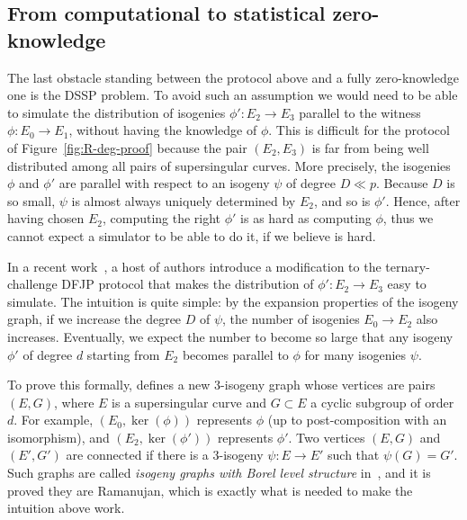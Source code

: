 \subsection{From computational to statistical zero-knowledge}
\label{sec:from-comp-stat}

The last obstacle standing between the protocol above and a fully
zero-knowledge one is the DSSP problem. To avoid such an assumption we would need
to be able to simulate the distribution of isogenies $\phi': E_2\to E_3$ parallel
to the witness $\phi: E_0\to E_1$, without having the knowledge of
$\phi$.  This is difficult for the protocol of
Figure~\ref{fig:R-deg-proof} because the pair $(E_2,E_3)$ is far from
being well distributed among all pairs of supersingular curves.
%
More precisely, the isogenies $\phi$ and $\phi'$ are parallel with
respect to an isogeny $\psi$ of degree $D \ll p$.  Because $D$ is so
small, $\psi$ is almost always uniquely determined by $E_2$, and so is
$\phi'$.  Hence, after having chosen $E_2$, computing the right
$\phi'$ is as hard as computing $\phi$, thus we cannot expect a
simulator to be able to do it, if we believe \R[deg] is hard.

In a recent work~\cite{cryptoeprint:2022/1469}, a host of
authors introduce a modification to the ternary-challenge DFJP
protocol that makes the distribution of $\phi':E_2\to E_3$ easy to
simulate. The intuition is quite simple: by the expansion properties
of the isogeny graph, if we increase the degree $D$ of $\psi$, the
number of isogenies $E_0\to E_2$ also increases.  Eventually, we
expect the number to become so large that any isogeny $\phi'$
of degree $d$ starting from $E_2$ becomes parallel to $\phi$ for many
isogenies $\psi$.

To prove this formally, \cite{cryptoeprint:2022/1469} defines a new $3$-isogeny graph whose
vertices are pairs $(E,G)$, where $E$ is a supersingular curve and
$G\subset E$ a cyclic subgroup of order $d$. For example,
$(E_0,\ker(\phi))$ represents $\phi$ (up to post-composition with an
isomorphism), and $(E_2,\ker(\phi'))$ represents $\phi'$. Two vertices
$(E,G)$ and $(E',G')$ are connected if there is a $3$-isogeny
$\psi:E\to E'$ such that $\psi(G) = G'$. 
Such graphs are called \emph{isogeny
  graphs with Borel level structure} in~\cite{cryptoeprint:2022/1469}, and it is proved they are Ramanujan,
which is exactly what is needed to make the intuition above work.

